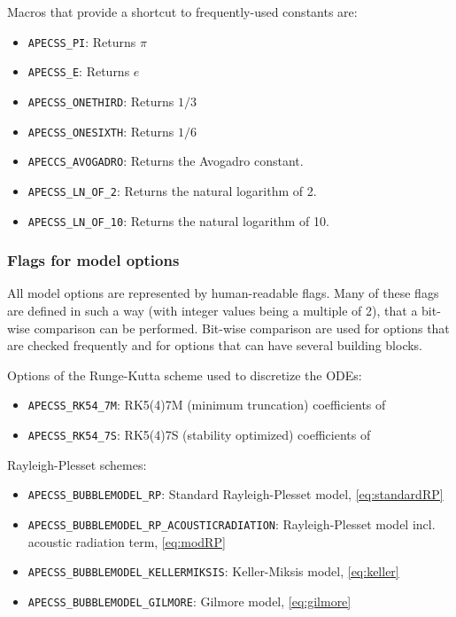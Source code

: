 Macros that provide a shortcut to frequently-used constants are:\vspace{-1em}
\begin{itemize}[noitemsep]
  \item {\tt APECSS\_PI}: Returns $\pi$
  \item {\tt APECSS\_E}: Returns $e$
  \item {\tt APECSS\_ONETHIRD}: Returns $1/3$
  \item {\tt APECSS\_ONESIXTH}: Returns $1/6$
  \item {\tt APECCS\_AVOGADRO}: Returns the Avogadro constant.
  \item {\tt APECSS\_LN\_OF\_2}: Returns the natural logarithm of 2.
  \item {\tt APECSS\_LN\_OF\_10}: Returns the natural logarithm of 10.
\end{itemize}

\subsubsection{Flags for model options}

All model options are represented by human-readable flags. Many of these flags are defined in such a way (with integer values being a multiple of 2), that a bit-wise comparison can be performed. Bit-wise comparison are used for options that are checked frequently and for options that can have several building blocks.

Options of the Runge-Kutta scheme used to discretize the ODEs:\vspace{-1em}
\begin{itemize}[noitemsep]
  \item {\tt APECSS\_RK54\_7M}: RK5(4)7M (minimum truncation) coefficients of \citet{Dormand1980}
  \item {\tt APECSS\_RK54\_7S}: RK5(4)7S (stability optimized) coefficients of \citet{Dormand1980}
\end{itemize}

Rayleigh-Plesset schemes:\vspace{-1em}
\begin{itemize}[noitemsep]
  \item {\tt APECSS\_BUBBLEMODEL\_RP}: Standard Rayleigh-Plesset model, \eqref{eq:standardRP}
  \item {\tt APECSS\_BUBBLEMODEL\_RP\_ACOUSTICRADIATION}: Rayleigh-Plesset model incl. acoustic radiation term, \eqref{eq:modRP}
  \item {\tt APECSS\_BUBBLEMODEL\_KELLERMIKSIS}: Keller-Miksis model, \eqref{eq:keller}
  \item {\tt APECSS\_BUBBLEMODEL\_GILMORE}: Gilmore model, \eqref{eq:gilmore}
\end{itemize}

